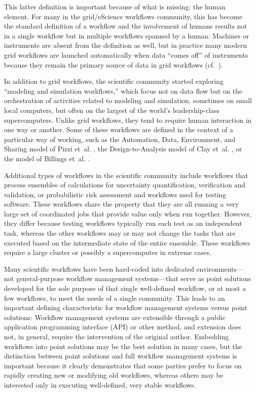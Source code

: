 This latter definition is important because of what is missing: the human
element. For many in the grid/eScience workflows community, this has become the
standard definition of a workflow and the involvement of humans results not in a
single workflow but in multiple workflows spanned by a human.  Machines or
instruments are absent from the definition as well, but in practice many modern
grid workflows are launched automatically when data ``comes off'' of instruments
because they remain the primary source of data in grid workflows
(cf.~\cite{megino_panda:_2015}).

In addition to grid workflows, the scientific community started exploring
``modeling and simulation workflows,'' which focus not on data flow but on the
orchestration of activities related to modeling and simulation,
sometimes on small local computers, but often on the largest of the world's
leadership-class supercomputers. Unlike grid workflows, they tend to require
human interaction in one way or another.  Some of these workflows are defined
in the context of a particular way of working, such as the Automation, Data,
Environment, and Sharing model of Pizzi et~al. \cite{pizzi_aiida:_2016}, the
Design-to-Analysis model of Clay et~al. \cite{clay_incorporating_2015}, or the
model of Billings et~al. \cite{billings_eclipse_2018}.

Additional types of workflows in the scientific community include workflows that
process ensembles of calculations for uncertainty quantification, verification
and validation, or probabilistic risk assessment \cite{montoya_apex_2016} and
workflows used for testing software. These workflows share the property
that they are all running a very large set of coordinated jobs that provide
value only when run together. However, they differ because testing workflows
typically run each test as an independent task, whereas the other workflows may
or may not change the tasks that are executed based on the intermediate state of
the entire ensemble. These workflows require a large cluster or possibly a
supercomputer in extreme cases.

Many scientific workflows have been hard-coded into dedicated environments---not
general-purpose workflow management systems---that serve as point solutions
developed for the sole purpose of that single well-defined workflow, or at most
a few workflows, to meet the needs of a single community. This leads to an
important defining characteristic for workflow management systems versus
point solutions: Workflow management systems are extensible through a public
application programming interface (API) or other method, and extension does not,
in general, require the intervention of the original author. Embedding workflows
into point solutions may be the best solution in many cases, but the
distinction between point solutions and full workflow management systems is
important because it clearly demonstrates  that some parties prefer to focus on
rapidly creating new or modifying old workflows, whereas others may be
interested only in executing well-defined, very stable workflows.

